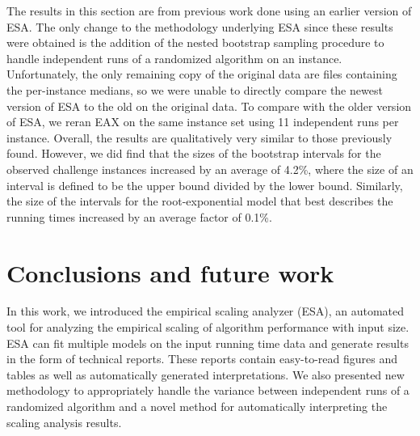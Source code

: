 \documentclass[aic]{iosart2x}
\begin{document}
The results in this section are from previous work done using an earlier version of ESA. The only change to the methodology underlying ESA since these results were obtained is the addition of the nested bootstrap sampling procedure to handle independent runs of a randomized algorithm on an instance.  Unfortunately, the only remaining copy of the original data are files containing the per-instance medians, so we were unable to directly compare the newest version of ESA to the old on the original data. To compare with the older version of ESA, we reran EAX on the same instance set using 11 independent runs per instance. Overall, the results are qualitatively very similar to those previously found. However, we did find that the sizes of the bootstrap intervals for the observed challenge instances increased by an average of 4.2\%, where the size of an interval is defined to be the upper bound divided by the lower bound. Similarly, the size of the intervals for the root-exponential model that best describes the running times increased by an average factor of 0.1\%. 

\section{Conclusions and future work}
\label{sec:Conclusion}

In this work, we introduced the empirical scaling analyzer (ESA), an automated tool for analyzing the empirical scaling of algorithm performance with input size. ESA can fit multiple models on the input running time data and generate results in the form of technical reports. These reports contain easy-to-read figures and tables as well as automatically generated interpretations. We also presented new methodology to appropriately handle the variance between independent runs of a randomized algorithm and a novel method for automatically interpreting the scaling analysis results.  
\end{document}
